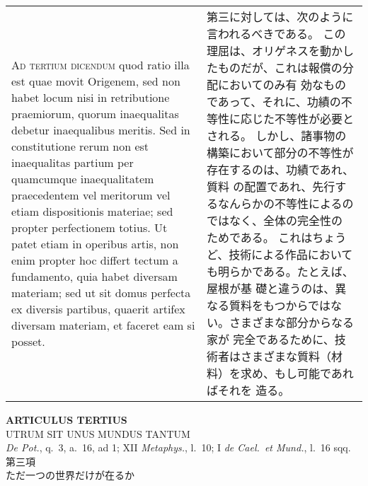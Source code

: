 \documentclass[10pt]{jsarticle} %
\begin{document}
\begin{longtable}{p{21em}p{21em}}
{\scshape Ad tertium dicendum} quod ratio illa est quae
movit Origenem, sed non habet locum nisi in retributione praemiorum,
quorum inaequalitas debetur inaequalibus meritis. Sed in constitutione
rerum non est inaequalitas partium per quamcumque inaequalitatem
praecedentem vel meritorum vel etiam dispositionis materiae; sed propter
perfectionem totius. Ut patet etiam in operibus artis, non enim propter
hoc differt tectum a fundamento, quia habet diversam materiam; sed ut
sit domus perfecta ex diversis partibus, quaerit artifex diversam
materiam, et faceret eam si posset.


&

第三に対しては、次のように言われるべきである。
この理屈は、オリゲネスを動かしたものだが、これは報償の分配においてのみ有
 効なものであって、それに、功績の不等性に応じた不等性が必要とされる。
しかし、諸事物の構築において部分の不等性が存在するのは、功績であれ、質料
 の配置であれ、先行するなんらかの不等性によるのではなく、全体の完全性の
 ためである。
これはちょうど、技術による作品においても明らかである。たとえば、屋根が基
 礎と違うのは、異なる質料をもつからではない。さまざまな部分からなる家が
 完全であるために、技術者はさまざまな質料（材料）を求め、もし可能であればそれを
 造る。



\end{longtable}
\newpage
{}

\begin{center}
 {\Large {\bf ARTICULUS TERTIUS}}\\
 {\large UTRUM SIT UNUS MUNDUS TANTUM}\\
 {\footnotesize {\itshape De Pot.}, q.~3, a.~16, ad 1; XII {\itshape
 Metaphys.}, l.~10; I {\itshape de Cael.~et Mund.}, l.~16 sqq.}\\
 {\Large 第三項\\ただ一つの世界だけが在るか}
\end{center}
\end{document}
